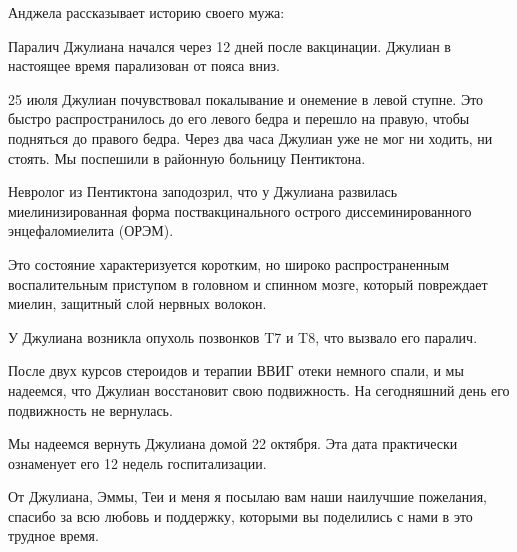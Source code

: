 Анджела рассказывает историю своего мужа:

Паралич Джулиана начался через 12 дней после вакцинации. Джулиан в настоящее
время парализован от пояса вниз.

25 июля Джулиан почувствовал покалывание и онемение в левой ступне. Это быстро
распространилось до его левого бедра и перешло на правую, чтобы подняться до
правого бедра. Через два часа Джулиан уже не мог ни ходить, ни стоять. Мы
поспешили в районную больницу Пентиктона.

Невролог из Пентиктона заподозрил, что у Джулиана развилась миелинизированная
форма поствакцинального острого диссеминированного энцефаломиелита (ОРЭМ).

Это состояние характеризуется коротким, но широко распространенным
воспалительным приступом в головном и спинном мозге, который повреждает миелин,
защитный слой нервных волокон.

У Джулиана возникла опухоль позвонков T7 и T8, что вызвало его паралич.

После двух курсов стероидов и терапии ВВИГ отеки немного спали, и мы надеемся,
что Джулиан восстановит свою подвижность. На сегодняшний день его подвижность не
вернулась.

Мы надеемся вернуть Джулиана домой 22 октября. Эта дата практически ознаменует
его 12 недель госпитализации.

От Джулиана, Эммы, Теи и меня я посылаю вам наши наилучшие пожелания, спасибо за
всю любовь и поддержку, которыми вы поделились с нами в это трудное время.
